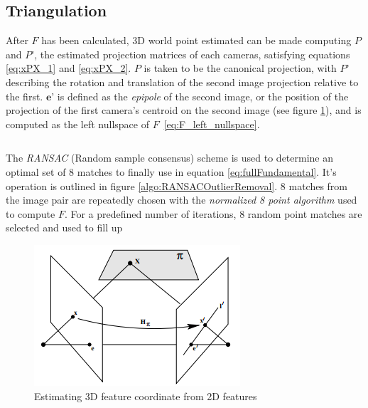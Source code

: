 \documentclass[Conference]{IEEEtran}
\begin{document}
\subsection{Triangulation}
After \(F\) has been calculated, 3D world point estimated can be made computing \(P\) and \(P’\), the estimated projection matrices of each cameras, satisfying equations \eqref{eq:xPX_1} and \eqref{eq:xPX_2}. \(P\) is taken to be the canonical projection, with \(P’\) describing the rotation and translation of the second image projection relative to the first. \(\textbf{e'}\) is defined as the \textit{epipole} of the second image, or the position of the projection of the first camera's centroid on the second image (see figure \ref{fig:homography}), and is computed as the left nullspace of \(F\)~\eqref{eq:F_left_nullspace}.

\begin{equation}\label{eq:xPX_1}\end{equation}
\begin{equation}\label{eq:xPX_2}\end{equation}
\begin{equation}\label{eq:P}\end{equation}
\begin{equation}\label{eq:P_prime}\end{equation}
\begin{equation}\label{eq:F_left_nullspace}\end{equation}


The \textit{RANSAC} (Random sample consensus) scheme is used to determine an optimal set of 8 matches to finally use in equation \ref{eq:fullFundamental}. It's operation is outlined in figure \ref{algo:RANSACOutlierRemoval}. 8 matches from the image pair are repeatedly chosen with the \textit{normalized 8 point algorithm} used to compute $F$. For a predefined number of iterations, 8 random point matches are selected and used to fill up 


\begin{figure}
\begin{center}
\includegraphics[scale=0.6]{images/homography.png}
\caption{Estimating 3D feature coordinate from 2D features~\cite{Hartley2004}}
\label{fig:homography}
\end{center}
\end{figure}
\end{document}
